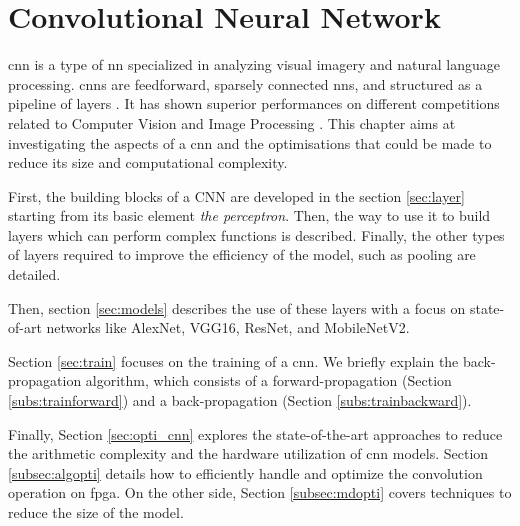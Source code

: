 \chapter{Convolutional Neural Network} \label{chap:cnn}
\acrshort{cnn} is a type of \acrshort{nn} specialized in analyzing visual imagery and natural language processing. \acrshort{cnn}s are feedforward, sparsely connected \acrshort{nn}s, and structured as a pipeline of layers \cite{abdelouahab_accelerating_2018}. It has shown superior performances on different competitions related to Computer Vision and Image Processing \cite{khan_survey_2020}. This chapter aims at investigating the aspects of a \acrshort{cnn} and the optimisations that could be made to reduce its size and computational complexity.

First, the building blocks of a CNN are developed in the section \ref{sec:layer} starting from its basic element \textit{the perceptron}. Then, the way to use it to build layers which can perform complex functions is described. Finally, the other types of layers required to improve the efficiency of the model, such as pooling are detailed.

Then, section \ref{sec:models} describes the use of these layers with a focus on state-of-art networks like AlexNet, VGG16, ResNet, and MobileNetV2.

Section \ref{sec:train} focuses on the training of a \acrshort{cnn}. We briefly explain the back-propagation algorithm, which consists of a forward-propagation (Section \ref{subs:trainforward}) and a back-propagation (Section \ref{subs:trainbackward}).

Finally, Section \ref{sec:opti_cnn} explores the state-of-the-art approaches to reduce the arithmetic complexity and the hardware utilization of \acrshort{cnn} models. Section \ref{subsec:algopti} details how to efficiently handle and optimize the convolution operation on \acrshort{fpga}. On the other side, Section \ref{subsec:mdopti} covers techniques to reduce the size of the model.
%
%

